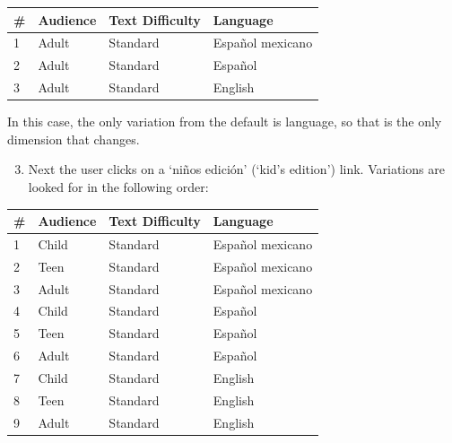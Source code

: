 \documentclass[letterpaper,10pt,english]{sphinxmanual}
\begin{document}
\begin{tabulary}{\linewidth}{|L|L|L|L|}
\hline
\textbf{
\#
} & \textbf{
Audience
} & \textbf{
Text Difficulty
} & \textbf{
Language
}\\
\hline

1
 & 
Adult
 & 
Standard
 & 
Español mexicano
\\

2
 & 
Adult
 & 
Standard
 & 
Español
\\

3
 & 
Adult
 & 
Standard
 & 
English
\\
\hline
\end{tabulary}


In this case, the only variation from the default is language, so that is the only dimension that changes.
\begin{enumerate}
\setcounter{enumi}{2}
\item {} 
Next the user clicks on a `niños edición' (`kid's edition') link. Variations are looked for in the following order:

\end{enumerate}

\begin{tabulary}{\linewidth}{|L|L|L|L|}
\hline
\textbf{
\#
} & \textbf{
Audience
} & \textbf{
Text Difficulty
} & \textbf{
Language
}\\
\hline

1
 & 
Child
 & 
Standard
 & 
Español mexicano
\\

2
 & 
Teen
 & 
Standard
 & 
Español mexicano
\\

3
 & 
Adult
 & 
Standard
 & 
Español mexicano
\\

4
 & 
Child
 & 
Standard
 & 
Español
\\

5
 & 
Teen
 & 
Standard
 & 
Español
\\

6
 & 
Adult
 & 
Standard
 & 
Español
\\

7
 & 
Child
 & 
Standard
 & 
English
\\

8
 & 
Teen
 & 
Standard
 & 
English
\\

9
 & 
Adult
 & 
Standard
 & 
English
\\
\hline
\end{tabulary}
\end{document}
